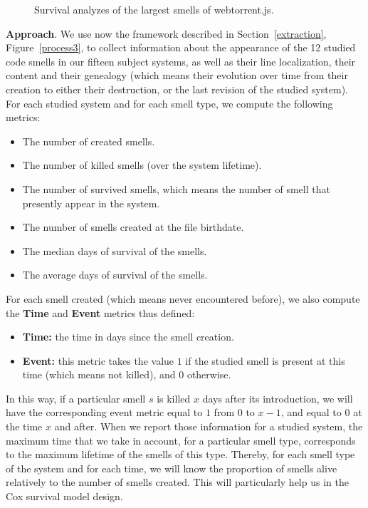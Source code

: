 {\begin{figure*}[!htbp]
	\centering%
	\caption{Survival analyzes of the largest smells of webtorrent.js.\vspace{-10pt}}
	\label{survivalplots15}
\end{figure*}

\textbf{Approach}. We use now the framework described in Section~\ref{extraction}, Figure~\ref{process3}, to collect information about the appearance of the 12 studied code smells in our fifteen subject systems, as well as their line localization, their content and their genealogy (which means their evolution over time from their creation to either their destruction, or the last revision of the studied system).
For each studied system and for each smell type, we compute the following metrics:
\begin{itemize}
	\item The number of created smells.
	\item The number of killed smells (over the system lifetime).
	\item The number of survived smells, which means the number of smell that presently appear in the system.
	\item The number of smells created at the file birthdate.
	\item The median days of survival of the smells.
	\item The average days of survival of the smells.
\end{itemize}
For each smell created (which means never encountered before), we also compute the \textbf{Time} and \textbf{Event} metrics thus defined: 
\begin{itemize}
	\item \textbf{Time:} the time in days since the smell creation.
	\item \textbf{Event:} this metric takes the value $1$ if the studied smell is present at this time (which means not killed), and $0$ otherwise.
\end{itemize}
In this way, if a particular smell $s$ is killed $x$ days after its introduction, we will have the corresponding event metric equal to $1$ from $0$ to $x-1$, and equal to $0$ at the time $x$ and after. When we report those information for a studied system, the maximum time that we take in account, for a particular smell type, corresponds to the maximum lifetime of the smells of this type. Thereby, for each smell type of the system and for each time, we will know the proportion of smells alive relatively to the number of smells created. This will particularly help us in the Cox survival model design.

}
